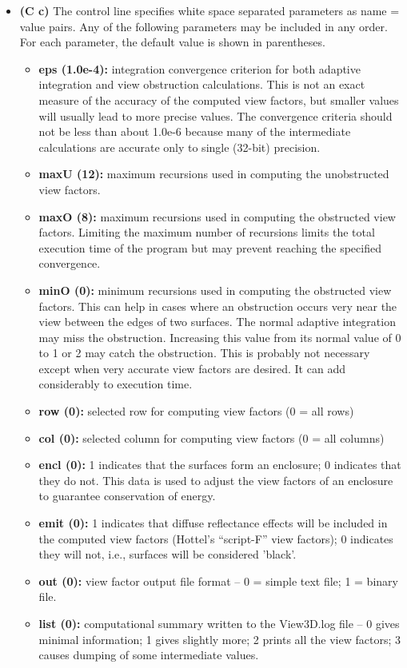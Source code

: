 \documentclass[10pt]{article}
\begin{document}
\begin{itemize}
\item\textbf{(C c)} The control line specifies white space separated parameters
as name = value pairs.  Any of the following parameters may be included in any
order. For each parameter, the default value is shown in parentheses.
\begin{itemize}
\item\textbf{eps (1.0e-4):} integration convergence criterion for both adaptive
integration and view obstruction calculations.  This is not an exact measure of
the accuracy of the computed view factors, but smaller values will usually lead
to more precise values. The convergence criteria should not be less than about
1.0e-6 because many of the intermediate calculations are accurate only to single
(32-bit) precision.
\item\textbf{maxU (12):} maximum recursions used in computing the unobstructed
view factors.
\item\textbf{maxO (8):} maximum recursions used in computing the obstructed
view factors. Limiting the maximum number of recursions limits the total
execution time of the program but may prevent reaching the specified
convergence.
\item\textbf{minO (0):} minimum recursions used in computing the obstructed
view factors. This can help in cases where an obstruction occurs very near the
view between the edges of two surfaces. The normal adaptive integration may
miss the obstruction. Increasing this value from its normal value of 0 to 1 
or 2 may catch the obstruction. This is probably not necessary except when very
accurate view factors are desired. It can add considerably to execution time.
\item\textbf{row (0):} selected row for computing view factors (0 = all rows)
\item\textbf{col (0):} selected column for computing view factors (0 = all
columns)
\item\textbf{encl (0):} 1 indicates that the surfaces form an enclosure; 0
indicates that they do not. This data is used to adjust the view factors of an
enclosure to guarantee conservation of energy.
\item\textbf{emit (0):} 1 indicates that diffuse reflectance effects will be
included in the computed view factors (Hottel’s “script-F” view factors); 0
indicates they will not, i.e., surfaces will be considered 'black'.
\item\textbf{out (0):} view factor output file format -- 0 = simple text file; 
1 = binary file.
\item\textbf{list (0):} computational summary written to the View3D.log file -- 
0 gives minimal information; 1 gives slightly more; 2 prints all the view
factors; 3 causes dumping of some intermediate values.
\end{itemize}


\end{itemize}
\end{document}
